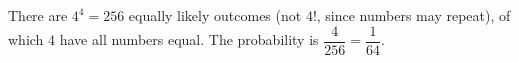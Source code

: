 There are $4^4=256$ equally likely outcomes (not $4!$, since numbers may repeat), of which $4$ have all numbers equal. The probability is $\dfrac{4}{256}=\boxed{\dfrac{1}{64}}$.
